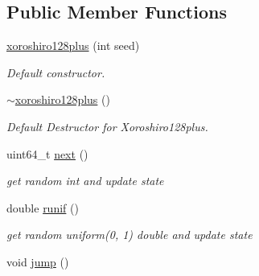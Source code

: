 \subsection*{Public Member Functions}
\begin{DoxyCompactItemize}
\item 
\hyperlink{classxoroshiro128plus_ae32867bf0900c675d3b6f638ea2c49e1}{xoroshiro128plus} (int seed)
\begin{DoxyCompactList}\small\item\em Default constructor. \end{DoxyCompactList}\item 
\mbox{\label{classxoroshiro128plus_ae6dfa2376788f9632175a385c6cf74ef}} 
\hyperlink{classxoroshiro128plus_ae6dfa2376788f9632175a385c6cf74ef}{$\sim$xoroshiro128plus} ()
\begin{DoxyCompactList}\small\item\em Default Destructor for Xoroshiro128plus. \end{DoxyCompactList}\item 
\mbox{\label{classxoroshiro128plus_a14185bcb657d561663803f4a8b2e9a92}} 
uint64\+\_\+t \hyperlink{classxoroshiro128plus_a14185bcb657d561663803f4a8b2e9a92}{next} ()
\begin{DoxyCompactList}\small\item\em get random int and update state \end{DoxyCompactList}\item 
\mbox{\label{classxoroshiro128plus_a5054e4de9c05fdab89ab41dbfe05a424}} 
double \hyperlink{classxoroshiro128plus_a5054e4de9c05fdab89ab41dbfe05a424}{runif} ()
\begin{DoxyCompactList}\small\item\em get random uniform(0, 1) double and update state \end{DoxyCompactList}\item 
void \hyperlink{classxoroshiro128plus_a8058dee37dfc67409ed8674ba8f830a9}{jump} ()
\end{DoxyCompactItemize}
